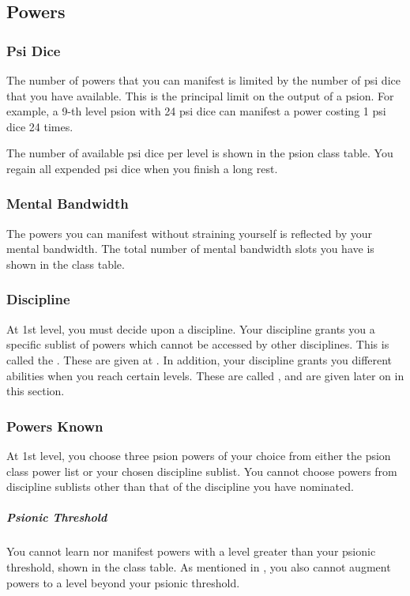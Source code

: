 \subsection{Powers}
\subsubsection{Psi Dice}
The number of powers that you can manifest
is limited by the number of psi dice that
you have available.
This is the principal limit on the output of a psion.
For example, a 9-th level psion with 24 psi dice
can manifest a power costing 1 psi dice 24 times.

The number of available psi dice per level
is shown in the psion class table.
You regain all expended psi dice when you finish
a long rest.

\subsubsection{Mental Bandwidth}
The powers you can manifest without straining yourself
is reflected by your mental bandwidth.
The total number of mental bandwidth slots you have
is shown in the class table.

\subsubsection{Discipline}
\label{subs:psion_discipline}
At 1st level,
you must decide upon a discipline.
Your discipline grants you a specific sublist of powers
which cannot be accessed by other disciplines.
This is called the .
These are given at .
In addition, your discipline grants you different abilities
when you reach certain levels.
These are called ,
and are given later on in this section.

\subsubsection{Powers Known}
At 1st level,
you choose three psion powers of your choice
from either the psion class power list
or your chosen discipline sublist.
You cannot choose powers from discipline sublists
other than that of the discipline you have nominated.

\subparagraph{Psionic Threshold}
You cannot learn nor manifest powers with a level
greater than your psionic threshold,
shown in the class table.
As mentioned in ,
you also cannot augment powers to a level
beyond your psionic threshold.

